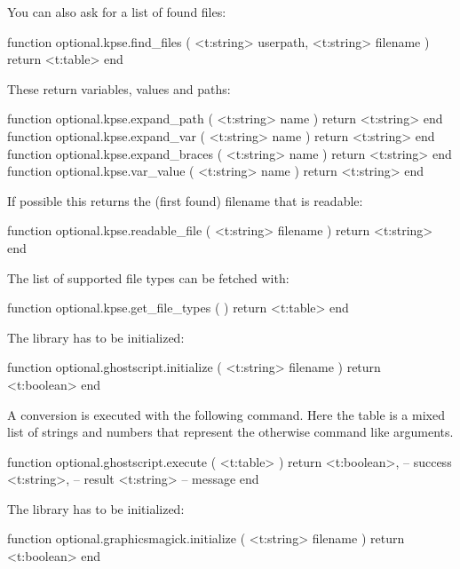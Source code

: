 You can also ask for a list of found files:

\starttyping[option=LUA]
function optional.kpse.find_files (
    <t:string> userpath,
    <t:string> filename
)
    return <t:table>
end
\stoptyping

These return variables, values and paths:

\starttyping[option=LUA]
function optional.kpse.expand_path   ( <t:string> name ) return <t:string> end
function optional.kpse.expand_var    ( <t:string> name ) return <t:string> end
function optional.kpse.expand_braces ( <t:string> name ) return <t:string> end
function optional.kpse.var_value     ( <t:string> name ) return <t:string> end
\stoptyping

If possible this returns the (first found) filename that is readable:

\starttyping[option=LUA]
function optional.kpse.readable_file ( <t:string> filename )
    return <t:string>
end
\stoptyping

The list of supported file types can be fetched with:

\starttyping[option=LUA]
function optional.kpse.get_file_types ( )
    return <t:table>
end
\stoptyping

\stopsubsection

\startsubsection[title=Graphics]

\startsubsubsubject[title=ghostscript]

The  library has to be initialized:

\starttyping[option=LUA]
function optional.ghostscript.initialize ( <t:string> filename )
    return <t:boolean>
end
\stoptyping

A conversion is executed with the following command. Here the table is a mixed
list of strings and numbers that represent the otherwise command like arguments.

\starttyping[option=LUA]
function optional.ghostscript.execute ( <t:table> )
    return
        <t:boolean>, -- success
        <t:string>,  -- result
        <t:string>   -- message
end
\stoptyping

\stopsubsubsubject

\startsubsubsubject[title=graphicsmagick]

The  library has to be initialized:

\starttyping[option=LUA]
function optional.graphicsmagick.initialize ( <t:string> filename )
    return <t:boolean>
end
\stoptyping

